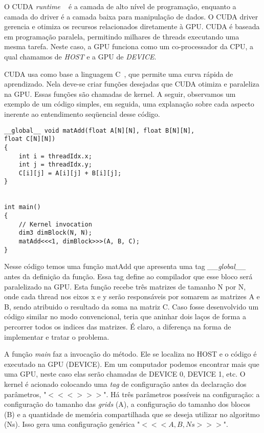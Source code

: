 O CUDA \textit{runtime} ~\citep{cuda} é a camada de alto nível de programação, enquanto a camada do driver é a camada baixa para manipulação de dados. O CUDA driver gerencia e otimiza os recursos relacionados diretamente à GPU. CUDA é baseada em programação paralela, permitindo milhares de threads executando uma mesma tarefa. Neste caso, a GPU funciona como um co-processador da CPU, a qual chamamos de \textit{HOST} e a GPU de \textit{DEVICE}.

CUDA usa como base a linguagem C~\citep{cuda}, que permite uma curva rápida de aprendizado. Nela deve-se criar funções desejadas que CUDA otimiza e paraleliza na GPU. Essas funções são chamadas de kernel. A seguir, observamos um exemplo de um código simples, em seguida, uma explanação sobre cada aspecto inerente ao entendimento seqüencial desse código.


\begin{verbatim}
__global__ void matAdd(float A[N][N], float B[N][N],
float C[N][N])
{
    int i = threadIdx.x;
    int j = threadIdx.y;
    C[i][j] = A[i][j] + B[i][j];
}


int main()
{
    // Kernel invocation
    dim3 dimBlock(N, N);
    matAdd<<<1, dimBlock>>>(A, B, C);
}

\end{verbatim}

Nesse código temos uma função matAdd que apresenta uma tag \textit{\_\_global\_\_} antes da definição da função. Essa tag define ao compilador que esse bloco será paralelizado na GPU.  Esta função recebe três matrizes de tamanho N por N, onde cada thread nos eixos x e y serão responsáveis por somarem as matrizes A e B, sendo atribuido o resultado da soma na matriz C.  Caso fosse desenvolvido um código similar no modo convencional, teria que aninhar dois laços de forma a percorrer todos os indices das matrizes. É claro, a diferença na forma de implementar e tratar o problema.

A função \textit{main} faz a invocação do método. Ele se localiza no HOST e o código é executado na GPU (DEVICE). Em um computador podemos encontrar mais que uma GPU, neste caso elas serão chamadas de DEVICE 0, DEVICE 1, etc. O kernel é acionado colocando uma \textit{tag} de configuração antes da declaração dos parâmetros, "$<<< >>>$". Há três parâmetros possíveis na configuração: a configuração do tamanho das \textit{grids} (A), a configuração do tamanho dos blocos (B) e a quantidade de memória compartilhada que se deseja utilizar no algoritmo (Ns). Isso gera uma configuração genérica "$<<<A,B,Ns >>>$".

